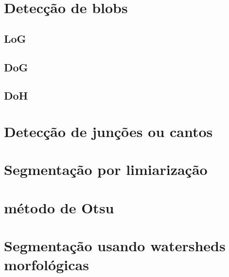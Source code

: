 \documentclass[
  brazilian,
]{book}
\begin{document}
\hypertarget{detecuxe7uxe3o-de-blobs}{%
\section{Detecção de blobs}\label{detecuxe7uxe3o-de-blobs}}

\hypertarget{log}{%
\subsection{LoG}\label{log}}

\hypertarget{dog}{%
\subsection{DoG}\label{dog}}

\hypertarget{doh}{%
\subsection{DoH}\label{doh}}

\hypertarget{detecuxe7uxe3o-de-junuxe7uxf5es-ou-cantos}{%
\section{Detecção de junções ou cantos}\label{detecuxe7uxe3o-de-junuxe7uxf5es-ou-cantos}}

\hypertarget{segmentauxe7uxe3o-por-limiarizauxe7uxe3o}{%
\section{Segmentação por limiarização}\label{segmentauxe7uxe3o-por-limiarizauxe7uxe3o}}

\hypertarget{muxe9todo-de-otsu}{%
\section{método de Otsu}\label{muxe9todo-de-otsu}}

\hypertarget{segmentauxe7uxe3o-usando-watersheds-morfoluxf3gicas}{%
\section{Segmentação usando watersheds morfológicas}\label{segmentauxe7uxe3o-usando-watersheds-morfoluxf3gicas}}

\backmatter

\printbibliography
\end{document}
